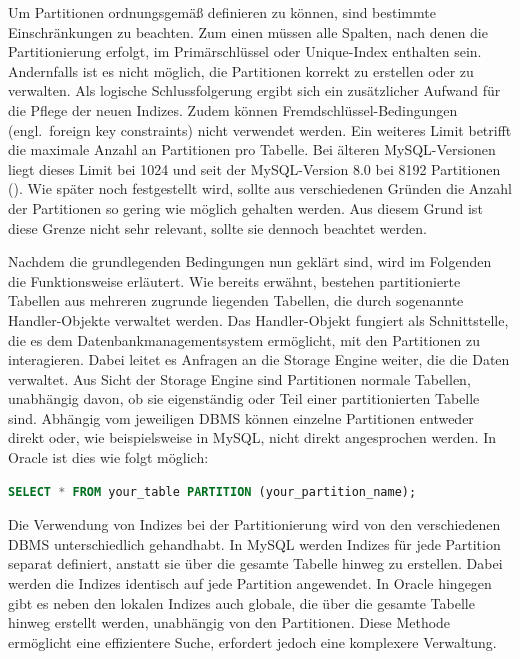 Um Partitionen ordnungsgemäß definieren zu können, sind bestimmte Einschränkungen zu beachten.
Zum einen müssen alle Spalten, nach denen die Partitionierung erfolgt, im Primärschlüssel oder Unique-Index enthalten sein.
Andernfalls ist es nicht möglich, die Partitionen korrekt zu erstellen oder zu verwalten.
Als logische Schlussfolgerung ergibt sich ein zusätzlicher Aufwand für die Pflege der neuen Indizes.
Zudem können Fremdschlüssel-Bedingungen (engl.\ foreign key constraints) nicht verwendet werden.
Ein weiteres Limit betrifft die maximale Anzahl an Partitionen pro Tabelle.
Bei älteren MySQL-Versionen liegt dieses Limit bei 1024 und seit der MySQL-Version 8.0 bei 8192 Partitionen (\cite{mysql_nof_partitions}).
Wie später noch festgestellt wird, sollte aus verschiedenen Gründen die Anzahl der Partitionen so gering wie möglich gehalten werden.
Aus diesem Grund ist diese Grenze nicht sehr relevant, sollte sie dennoch beachtet werden.

Nachdem die grundlegenden Bedingungen nun geklärt sind, wird im Folgenden die Funktionsweise erläutert.
Wie bereits erwähnt, bestehen partitionierte Tabellen aus mehreren zugrunde liegenden Tabellen, die durch sogenannte Handler-Objekte verwaltet werden.
Das Handler-Objekt fungiert als Schnittstelle, die es dem Datenbankmanagementsystem ermöglicht, mit den Partitionen zu interagieren.
Dabei leitet es Anfragen an die Storage Engine weiter, die die Daten verwaltet.
Aus Sicht der Storage Engine sind Partitionen normale Tabellen, unabhängig davon, ob sie eigenständig oder Teil einer partitionierten Tabelle sind.
Abhängig vom jeweiligen DBMS können einzelne Partitionen entweder direkt oder, wie beispielsweise in MySQL, nicht direkt angesprochen werden.
In Oracle ist dies wie folgt möglich:

\vspace{-5pt}
\begin{lstlisting}[language=SQL,label={lst:direct_partition}]
SELECT * FROM your_table PARTITION (your_partition_name);
\end{lstlisting}
\vspace{-7pt}

Die Verwendung von Indizes bei der Partitionierung wird von den verschiedenen DBMS unterschiedlich gehandhabt.
In MySQL werden Indizes für jede Partition separat definiert, anstatt sie über die gesamte Tabelle hinweg zu erstellen.
Dabei werden die Indizes identisch auf jede Partition angewendet.
In Oracle hingegen gibt es neben den lokalen Indizes auch globale, die über die gesamte Tabelle hinweg erstellt werden, unabhängig von den Partitionen.
Diese Methode ermöglicht eine effizientere Suche, erfordert jedoch eine komplexere Verwaltung.

